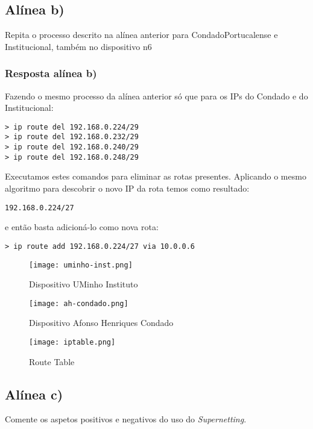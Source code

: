 \documentclass{article}
\begin{document}
\subsection{Alínea b)}

Repita o processo descrito na alínea anterior para CondadoPortucalense e Institucional, também no dispositivo n6

\subsubsection{Resposta alínea b)}

 Fazendo o mesmo processo da alínea anterior só que para os IPs do Condado e do Institucional:

 \begin{lstlisting}
> ip route del 192.168.0.224/29
> ip route del 192.168.0.232/29
> ip route del 192.168.0.240/29
> ip route del 192.168.0.248/29
\end{lstlisting}

Executamos estes comandos para eliminar as rotas presentes.
Aplicando o mesmo algoritmo para descobrir o novo IP da rota temos como resultado: 
\begin{lstlisting}
192.168.0.224/27
\end{lstlisting}
 e então basta adicioná-lo como nova rota:
 \begin{lstlisting}
> ip route add 192.168.0.224/27 via 10.0.0.6
\end{lstlisting}
\pagebreak
\begin{figure}[h]
    \centering
    \texttt{[image: uminho-inst.png]}
    \caption{Dispositivo UMinho Instituto}
\end{figure}

\begin{figure}[h]
    \centering
    \texttt{[image: ah-condado.png]}
    \caption{Dispositivo Afonso Henriques Condado}
\end{figure}

\begin{figure}[h]
    \centering
    \texttt{[image: iptable.png]}
    \caption{Route Table}
\end{figure}

\subsection{Alínea c)}

Comente os aspetos positivos e negativos do uso do \emph{Supernetting}.
\end{document}
